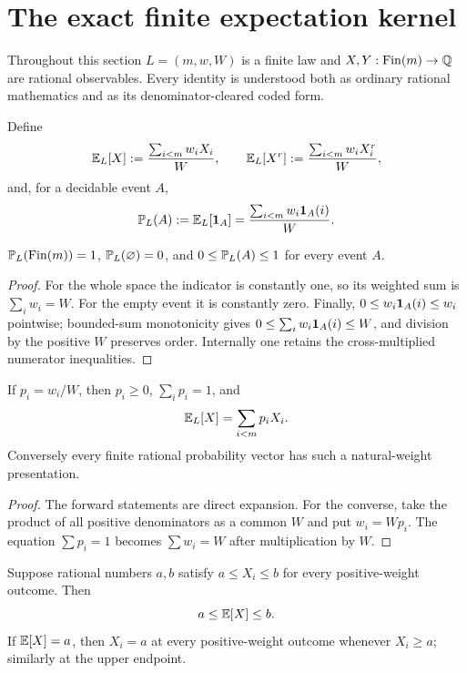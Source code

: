 \section{The exact finite expectation kernel}\label{sec:finite}

Throughout this section \(L=(m,w,W)\) is a finite law and
\(X,Y:\operatorname{Fin}(m)\to\mathbb Q\) are rational observables.  Every identity is understood
both as ordinary rational mathematics and as its denominator-cleared coded
form.

\begin{definition}\label{def:expect}
Define
\[
 \mathbb E_L[X]\mathrel{:=}\frac{\sum_{i<m}w_iX_i}{W},\qquad
 \mathbb E_L[X^r]\mathrel{:=}\frac{\sum_{i<m}w_iX_i^r}{W},
\]
and, for a decidable event \(A\),
\[
 \mathbb P_L(A)\mathrel{:=}\mathbb E_L[\mathbf 1_A]
 =\frac{\sum_{i<m}w_i\mathbf 1_A(i)}{W}.
\]
\end{definition}

\begin{theorem}[Normalization]\label{thm:normalization}
\(\mathbb P_L(\operatorname{Fin}(m))=1\), \(\mathbb P_L(\varnothing)=0\), and
\(0\le\mathbb P_L(A)\le1\) for every event \(A\).
\end{theorem}

\begin{proof}
For the whole space the indicator is constantly one, so its weighted sum is
\(\sum_iw_i=W\).  For the empty event it is constantly zero.  Finally,
\(0\le w_i\mathbf 1_A(i)\le w_i\) pointwise; bounded-sum monotonicity gives
\(0\le\sum_iw_i\mathbf 1_A(i)\le W\), and division by the positive \(W\) preserves
order.  Internally one retains the cross-multiplied numerator inequalities.
\end{proof}

\begin{theorem}\label{thm:weighted-average}
If \(p_i=w_i/W\), then \(p_i\ge0\), \(\sum_i p_i=1\), and
\[
 \mathbb E_L[X]=\sum_{i<m}p_iX_i.
\]
Conversely every finite rational probability vector has such a natural-weight
presentation.
\end{theorem}

\begin{proof}
The forward statements are direct expansion.  For the converse, take the
product of all positive denominators as a common \(W\) and put \(w_i=Wp_i\).
The equation \(\sum p_i=1\) becomes \(\sum w_i=W\) after multiplication by
\(W\).
\end{proof}

\begin{theorem}\label{thm:convex-hull}
Suppose rational numbers \(a,b\) satisfy
\(a\le X_i\le b\) for every positive-weight outcome.  Then
\[
 a\le\mathbb E[X]\le b.
\]
If \(\mathbb E[X]=a\), then \(X_i=a\) at every positive-weight outcome whenever
\(X_i\ge a\); similarly at the upper endpoint.
\end{theorem}

